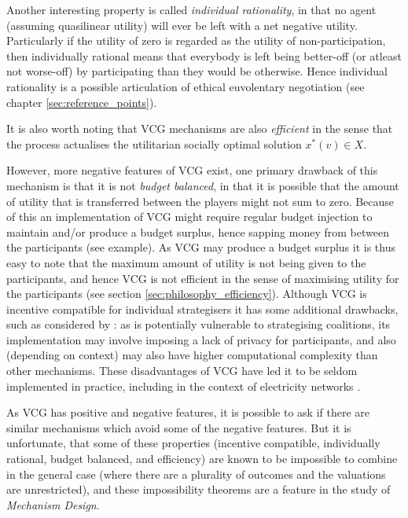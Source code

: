 Another interesting property is called \textit{individual rationality}, in that no agent (assuming quasilinear utility) will ever be left with a net negative utility. Particularly if the utility of zero is regarded as the utility of non-participation, then individually rational means that everybody is left being better-off (or atleast not worse-off) by participating than they would be otherwise. Hence individual rationality is a possible articulation of ethical euvolentary negotiation (see chapter \ref{sec:reference_points}).

It is also worth noting that VCG mechanisms are also \textit{efficient} in the sense that the process actualises the utilitarian socially optimal solution $x^*(v) \in X$.

However, more negative features of VCG exist, one primary drawback of this mechanism is that it is not \textit{budget balanced}, in that it is possible that the amount of utility that is transferred between the players might not sum to zero.
Because of this an implementation of VCG might require regular budget injection to maintain and/or produce a budget surplus, hence sapping money from between the participants (see example).
As VCG may produce a budget surplus it is thus easy to note that the maximum amount of utility is not being given to the participants, and hence VCG is not efficient in the sense of maximising utility for the participants (see section \ref{sec:philosophy_efficiency}).
Although VCG is incentive compatible for individual strategisers it has some additional drawbacks, such as considered by \cite{ShohamLeytonBrown09}: as is potentially vulnerable to strategising coalitions, its implementation may involve imposing a lack of privacy for participants, and also (depending on context) may also have higher computational complexity than other mechanisms.
These disadvantages of VCG have led it to be seldom implemented in practice, including in the context of electricity networks \citep{Rothkopf07, Ausubel2006}.

As VCG has positive and negative features, it is possible to ask if there are similar mechanisms which avoid some of the negative features.
But it is unfortunate, that some of these properties (incentive compatible, individually rational, budget balanced, and efficiency) are known to be impossible to combine in the general case (where there are a plurality of outcomes and the valuations are unrestricted), and these impossibility theorems are a feature in the study of \textit{Mechanism Design}.%

